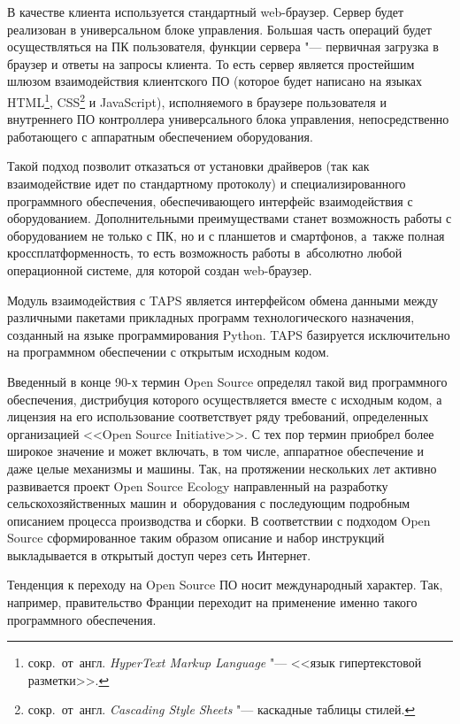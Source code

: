 В качестве клиента используется стандартный \foreignlanguage{english}{web}-браузер. Сервер будет реализован в универсальном блоке управления. Большая часть операций будет осуществляться на ПК пользователя, функции сервера "--- первичная загрузка в браузер и ответы на запросы клиента. То есть сервер является простейшим шлюзом взаимодействия клиентского ПО (которое будет написано на языках \foreignlanguage{english}{HTML}\footnote{сокр.~от~англ. \textit{HyperText Markup Language} "--- <<язык гипертекстовой разметки>>.}, \foreignlanguage{english}{CSS}\footnote{сокр.~от~англ. \textit{Cascading Style Sheets} "--- каскадные таблицы стилей.} и \foreignlanguage{english}{JavaScript}), исполняемого в браузере пользователя и внутреннего ПО контроллера универсального блока управления, непосредственно работающего с аппаратным обеспечением оборудования.

Такой подход позволит отказаться от установки драйверов (так как взаимодействие идет по стандартному протоколу) и специализированного программного обеспечения, обеспечивающего интерфейс взаимодействия с оборудованием. Дополнительными преимуществами станет возможность работы с оборудованием не только с ПК, но и с планшетов и смартфонов, а~также полная кроссплатформенность, то есть возможность работы в~абсолютно любой операционной системе, для которой создан \foreignlanguage{english}{web}-браузер.

Модуль взаимодействия с TAPS является интерфейсом обмена данными между различными пакетами прикладных программ технологического назначения, созданный на языке программирования Python. \foreignlanguage{english}{TAPS} базируется исключительно на программном обеспечении с открытым исходным кодом.

Введенный в конце 90-х термин Open Source определял такой вид программного обеспечения, дистрибуция которого осуществляется вместе с исходным кодом, а лицензия на его использование соответствует ряду требований, определенных организацией <<Open Source Initiative>>. С тех пор термин приобрел более широкое значение и может включать, в том числе, аппаратное обеспечение и даже целые механизмы и машины. Так, на протяжении нескольких лет активно развивается проект Open Source Ecology направленный на разработку сельскохозяйственных машин и~оборудования с последующим подробным описанием процесса производства и сборки. В соответствии с подходом Open Source сформированное таким образом описание и набор инструкций выкладывается в открытый доступ через сеть Интернет.

Тенденция к переходу на Open Source ПО носит международный характер. Так, например, правительство Франции переходит на применение именно такого программного обеспечения.

